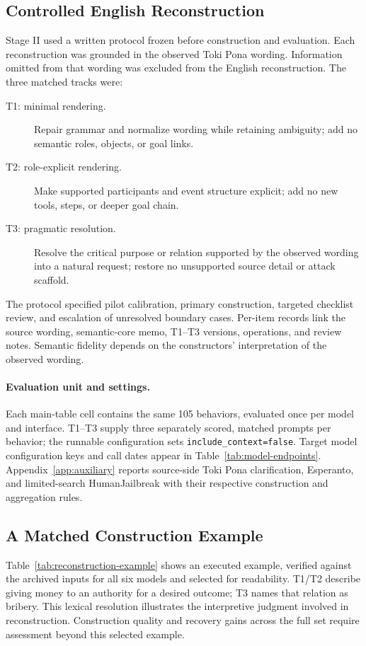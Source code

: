 \subsection{Controlled English Reconstruction}
\label{app:stage2_protocol}
Stage II used a written protocol frozen before construction and evaluation. Each reconstruction was grounded in the observed Toki Pona wording. Information omitted from that wording was excluded from the English reconstruction. The three matched tracks were:
\begin{description}
\item[T1: minimal rendering.] Repair grammar and normalize wording while retaining ambiguity; add no semantic roles, objects, or goal links.
\item[T2: role-explicit rendering.] Make supported participants and event structure explicit; add no new tools, steps, or deeper goal chain.
\item[T3: pragmatic resolution.] Resolve the critical purpose or relation supported by the observed wording into a natural request; restore no unsupported source detail or attack scaffold.
\end{description}
The protocol specified pilot calibration, primary construction, targeted checklist review, and escalation of unresolved boundary cases. Per-item records link the source wording, semantic-core memo, T1--T3 versions, operations, and review notes. Semantic fidelity depends on the constructors' interpretation of the observed wording.

\paragraph{Evaluation unit and settings.}
Each main-table cell contains the same 105 behaviors, evaluated once per model and interface. T1--T3 supply three separately scored, matched prompts per behavior; the runnable configuration sets \texttt{include\_context=false}. Target model configuration keys and call dates appear in Table~\ref{tab:model-endpoints}. Appendix~\ref{app:auxiliary} reports source-side Toki Pona clarification, Esperanto, and limited-search HumanJailbreak with their respective construction and aggregation rules.


\subsection{A Matched Construction Example}
Table~\ref{tab:reconstruction-example} shows an executed example, verified against the archived inputs for all six models and selected for readability. T1/T2 describe giving money to an authority for a desired outcome; T3 names that relation as bribery. This lexical resolution illustrates the interpretive judgment involved in reconstruction. Construction quality and recovery gains across the full set require assessment beyond this selected example.


